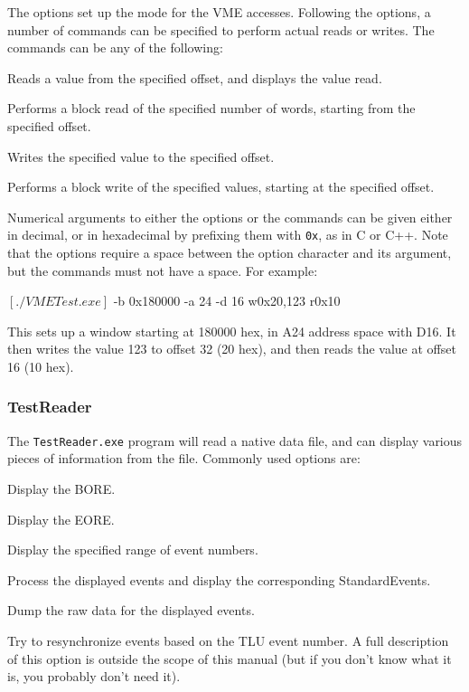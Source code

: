 The options set up the mode for the VME accesses.
Following the options, a number of commands can be specified to perform actual reads or writes.
The commands can be any of the following:
\begin{description}
Reads a value from the specified offset, and displays the value read.

Performs a block read of the specified number of words, starting from the specified offset.

Writes the specified value to the specified offset.

Performs a block write of the specified values, starting at the specified offset.

\end{description}

Numerical arguments to either the options or the commands can be given either in decimal,
or in hexadecimal by prefixing them with \texttt{0x}, as in C or C++.
Note that the options require a space between the option character and its argument,
but the commands must not have a space.
For example:

\begin{listing}[mybash]
$[./VMETest.exe]$ -b 0x180000 -a 24 -d 16 w0x20,123 r0x10
\end{listing}

This sets up a window starting at 180000 hex, in A24 address space with D16.
It then writes the value 123 to offset 32 (20 hex), and then reads the value at offset 16 (10 hex).

\subsubsection{TestReader}\label{sec:TestReader}
The \texttt{TestReader.exe} program will read a native data file,
and can display various pieces of information from the file.
Commonly used options are:
\begin{description}
Display the \gls{BORE}.

Display the \gls{EORE}.

Display the specified range of event numbers.

Process the displayed events and display the corresponding StandardEvents.

Dump the raw data for the displayed events.

Try to resynchronize events based on the \gls{TLU} event number.
A full description of this option is outside the scope of this manual
(but if you don't know what it is, you probably don't need it).

\end{description}

